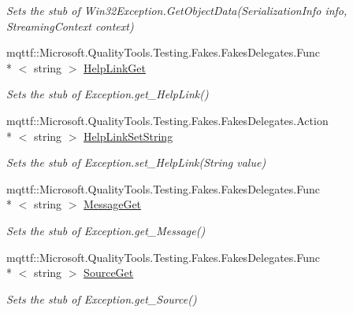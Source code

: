 \begin{DoxyCompactItemize}
\begin{DoxyCompactList}\small\item\em Sets the stub of Win32\-Exception.\-Get\-Object\-Data(\-Serialization\-Info info, Streaming\-Context context)\end{DoxyCompactList}\item 
mqttf\-::\-Microsoft.\-Quality\-Tools.\-Testing.\-Fakes.\-Fakes\-Delegates.\-Func\\*
$<$ string $>$ \hyperlink{class_system_1_1_net_1_1_network_information_1_1_fakes_1_1_stub_network_information_exception_a110da7884b9d2b075d92278bf95c4921}{Help\-Link\-Get}
\begin{DoxyCompactList}\small\item\em Sets the stub of Exception.\-get\-\_\-\-Help\-Link()\end{DoxyCompactList}\item 
mqttf\-::\-Microsoft.\-Quality\-Tools.\-Testing.\-Fakes.\-Fakes\-Delegates.\-Action\\*
$<$ string $>$ \hyperlink{class_system_1_1_net_1_1_network_information_1_1_fakes_1_1_stub_network_information_exception_abc0fa6472e68fadd3ad3f0b978438c03}{Help\-Link\-Set\-String}
\begin{DoxyCompactList}\small\item\em Sets the stub of Exception.\-set\-\_\-\-Help\-Link(\-String value)\end{DoxyCompactList}\item 
mqttf\-::\-Microsoft.\-Quality\-Tools.\-Testing.\-Fakes.\-Fakes\-Delegates.\-Func\\*
$<$ string $>$ \hyperlink{class_system_1_1_net_1_1_network_information_1_1_fakes_1_1_stub_network_information_exception_aaf7dc3b65d0c5509c483018c73f2d968}{Message\-Get}
\begin{DoxyCompactList}\small\item\em Sets the stub of Exception.\-get\-\_\-\-Message()\end{DoxyCompactList}\item 
mqttf\-::\-Microsoft.\-Quality\-Tools.\-Testing.\-Fakes.\-Fakes\-Delegates.\-Func\\*
$<$ string $>$ \hyperlink{class_system_1_1_net_1_1_network_information_1_1_fakes_1_1_stub_network_information_exception_a081912a58a827245f965950980deafe2}{Source\-Get}
\begin{DoxyCompactList}\small\item\em Sets the stub of Exception.\-get\-\_\-\-Source()\end{DoxyCompactList}\item 

\end{DoxyCompactItemize}
